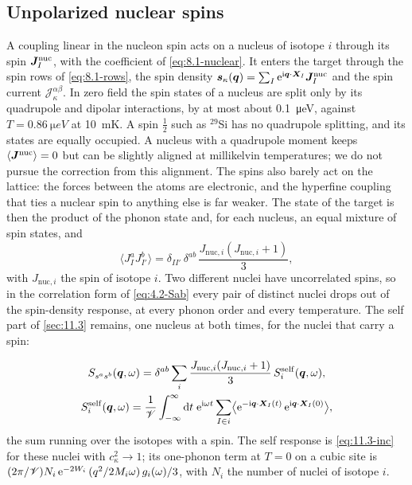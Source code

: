 \subsection{Unpolarized nuclear spins}\label{sec:11.6-spins}

A coupling linear in the nucleon spin acts on a nucleus of isotope $i$ through its spin $\bm{J}^{\mathrm{nuc}}_I$, with the coefficient of \cref{eq:8.1-nuclear}. It enters the target through the spin rows of \cref{eq:8.1-rows}, the spin density $\bm{s}_\kappa(\bm{q}) = \sum_I\mathrm{e}^{\mathrm{i}\bm{q}\cdot\bm{X}_I}\bm{J}^{\mathrm{nuc}}_I$ and the spin current $\mathcal{J}^{\alpha\beta}_\kappa$. In zero field the spin states of a nucleus are split only by its quadrupole and dipolar interactions, by at most about \SI{0.1}{\micro eV}, against $T = \SI{0.86}{\micro eV}$ at \SI{10}{mK}. A spin $\frac12$ such as $^{29}$Si has no quadrupole splitting, and its states are equally occupied. A nucleus with a quadrupole moment keeps $\langle\bm{J}^{\mathrm{nuc}}\rangle = 0$ but can be slightly aligned at millikelvin temperatures; we do not pursue the correction from this alignment. The spins also barely act on the lattice: the forces between the atoms are electronic, and the hyperfine coupling that ties a nuclear spin to anything else is far weaker. The state of the target is then the product of the phonon state and, for each nucleus, an equal mixture of spin states, and
\begin{equation*}
  \bigl\langle J^{a}_IJ^{b}_{I'}\bigr\rangle = \delta_{II'}\,\delta^{ab}\,\frac{J_{\mathrm{nuc},i}(J_{\mathrm{nuc},i} + 1)}{3} ,
\end{equation*}
with $J_{\mathrm{nuc},i}$ the spin of isotope $i$. Two different nuclei have uncorrelated spins, so in the correlation form of \cref{eq:4.2-Sab} every pair of distinct nuclei drops out of the spin-density response, at every phonon order and every temperature. The self part of \cref{sec:11.3} remains, one nucleus at both times, for the nuclei that carry a spin:
\begin{keyresult}
\begin{equation}
  \begin{gathered}
  S_{s^as^b}(\bm{q},\omega) = \delta^{ab}\sum_i\frac{J_{\mathrm{nuc},i}(J_{\mathrm{nuc},i} + 1)}{3}\,S^{\mathrm{self}}_i(\bm{q},\omega) , \\
  S^{\mathrm{self}}_i(\bm{q},\omega) = \frac1{\mathscr{V}}\int_{-\infty}^{\infty}\mathrm{d} t\;\mathrm{e}^{\mathrm{i}\omega t}\sum_{I\in i}\bigl\langle\mathrm{e}^{-\mathrm{i}\bm{q}\cdot\bm{X}_I(t)}\,\mathrm{e}^{\mathrm{i}\bm{q}\cdot\bm{X}_I(0)}\bigr\rangle ,
  \end{gathered}
  \label{eq:11.6-spinS}
\end{equation}
the sum running over the isotopes with a spin. The self response is \cref{eq:11.3-inc} for these nuclei with $c_\kappa^2 \to 1$; its one-phonon term at $T = 0$ on a cubic site is $(2\pi/\mathscr{V})N_i\,\mathrm{e}^{-2W_i}\,(q^2/2M_i\omega)\,g_i(\omega)/3$, with $N_i$ the number of nuclei of isotope $i$.
\end{keyresult}
